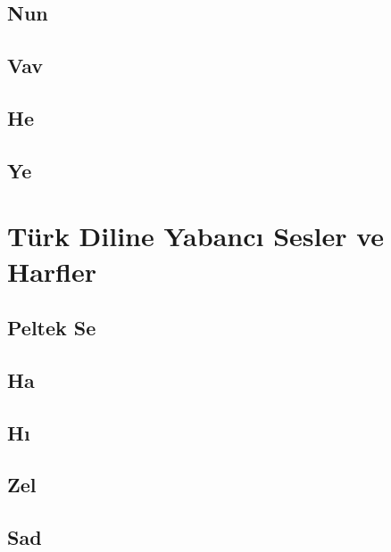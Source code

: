\subsection*{Nun}
\uyumluharftablo{\arnun}{\Lnun\latdownnun}{\isimnun}{\trtlfnun}

\subsection*{Vav}
\uyumluharftablo{\arvav}{\Lvav\latdownvav}{\isimvav}{\trtlfvav}

\subsection*{He}
\uyumluharftablo{\arhe}{\Lhe\latdownhe}{\isimhe}{\trtlfhe}

\subsection*{Ye}
\uyumluharftablo{\arye}{\Lye\latdownye}{\isimye}{\trtlfye}



\section{Türk Diline Yabancı Sesler ve Harfler}

\subsection*{Peltek Se}
\hariciharftablo{\arthe}{\Lthe\latdownthe}{\isimthe}{\trtlfthe}{\artlfthe}

\subsection*{Ha}
\hariciharftablo{\arha}{\Lha\latdownha}{\isimha}{\trtlfha}{\artlfha}

\subsection*{Hı}
\hariciharftablo{\arxa}{\Lxa\latdownxa}{\isimxa}{\trtlfxa}{\artlfxa}

\subsection*{Zel}
\hariciharftablo{\arzel}{\Lzel\latdownzel}{\isimzel}{\trtlfzel}{\artlfzel}

\subsection*{Sad}
\hariciharftablo{\arsad}{\Lsad\latdownsad}{\isimsad}{\trtlfsad}{\artlfsad}

